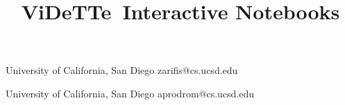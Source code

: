 \documentclass[numbers]{sigplanconf}
\begin{document}
\sectionfont{\MakeUppercase}

\newcommand{\projname}[0]{ViDeTTe}
\newcommand{\angular}[0]{AngularJS}
\newcommand{\react}[0]{React}

\title{\projname\ Interactive Notebooks}

           {University of California, San Diego}
           {zarifis@cs.ucsd.edu}
           
           {University of California, San Diego}
           {aprodrom@cs.ucsd.edu}
                      
\maketitle



 

\begin{sloppypar}

%
%

%


%

%

%


%
%

%

%


%

%

%



%





%
%

\end{sloppypar}



{
\scriptsize 

}


%
%

%
\end{document}
